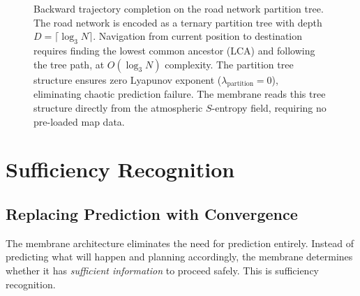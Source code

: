 \documentclass[twocolumn,10pt]{article}
\theoremstyle{definition}
\theoremstyle{remark}
\begin{document}
\begin{figure}[H]
\centering
{}
\caption{Backward trajectory completion on the road network partition tree. The road network is encoded as a ternary partition tree with depth $D = \lceil\log_3 N\rceil$. Navigation from current position to destination requires finding the lowest common ancestor (LCA) and following the tree path, at $O(\log_3 N)$ complexity. The partition tree structure ensures zero Lyapunov exponent ($\lambda_{\mathrm{partition}} = 0$), eliminating chaotic prediction failure. The membrane reads this tree structure directly from the atmospheric $S$-entropy field, requiring no pre-loaded map data.}
\label{fig:backward_trajectory}
\end{figure}


\section{Sufficiency Recognition}
\label{sec:sufficiency}

\subsection{Replacing Prediction with Convergence}

The membrane architecture eliminates the need for prediction entirely. Instead of predicting what will happen and planning accordingly, the membrane determines whether it has \emph{sufficient information} to proceed safely. This is sufficiency recognition.
\end{document}
